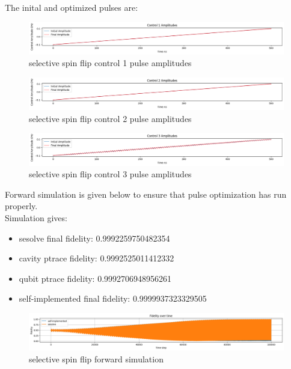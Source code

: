 \documentclass[12pt]{article}
\begin{document}
The inital and optimized pulses are: 
\begin{figure}[H]
    \centering
    \includegraphics[width=0.95\linewidth]{selective_spin_flip_GRAPE_500,_100_000_LIN_constraints_control1.png}
    \caption{selective spin flip control 1 pulse amplitudes}
    \label{fig:selective_spin_flip_constrains_control1}
\end{figure}
\begin{figure}[H]
    \centering
    \includegraphics[width=0.95\linewidth]{selective_spin_flip_GRAPE_500,_100_000_LIN_constraints_control2.png}
    \caption{selective spin flip control 2 pulse amplitudes}
    \label{fig:selective_spin_flip_constrains_control2}
\end{figure}
\begin{figure}[H]
    \centering
    \includegraphics[width=0.95\linewidth]{selective_spin_flip_GRAPE_500,_100_000_LIN_constraints_control3.png}
    \caption{selective spin flip control 3 pulse amplitudes}
    \label{fig:selective_spin_flip_constrains_control3}
\end{figure}

Forward simulation is given below to ensure that pulse optimization has run properly. 
\\
Simulation gives: 
\begin{itemize}
    \item sesolve final fidelity:  0.9992259750482354
    \item cavity ptrace fidelity:  0.9992525011412332
    \item qubit ptrace fidelity:  0.9992706948956261
    \item self-implemented final fidelity:  0.9999937323329505
\end{itemize}
\begin{figure}[H]
    \centering
    \includegraphics[width=0.95\linewidth]{selective_spin_flip_GRAPE_500,_100_000_LIN_constraints_simulation.png}
    \caption{selective spin flip forward simulation}
    \label{fig:selective_spin_flip_constraints_forward_simulation}
\end{figure}
\end{document}

